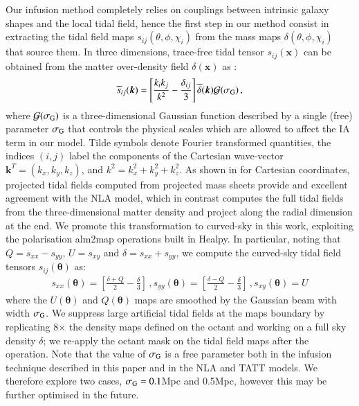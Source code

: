 \documentclass[useAMS,usenatbib]{mn2e}
\begin{document}
Our infusion method completely relies on couplings between intrinsic galaxy shapes and the local tidal field, hence the first step in our method consist in extracting the tidal field maps $s_{ij}(\theta,\phi,\chi_i)$ from the mass maps $\delta(\theta,\phi,\chi_i)$ that source them. In three dimensions, trace-free tidal tensor $s_{ij}(\boldsymbol x)$ can be obtained from the matter over-density field $\delta(\boldsymbol x)$ as   \citep{Catelan_IA_Tidal}:
\begin{eqnarray}
 \widetilde{s}_{ij} (\boldsymbol k)  = \left[\frac{k_i k_j}{k^2} - \frac{\delta_{ij}}{3}\right]  \widetilde {\delta}(\boldsymbol k) \mathcal{G}(\sigma_{\rm G}) \, ,
 \label{eq:sij}
\end{eqnarray}
where $\mathcal{G}(\sigma_{\rm G})$ is a three-dimensional Gaussian function described by a single (free) parameter $\sigma_{\rm G}$ that  controls the physical scales which are allowed to affect the IA term in our model. 
Tilde symbols  denote Fourier transformed quantities,  the indices $(i,j)$ label the components of the Cartesian wave-vector $\boldsymbol{k}^T = (k_x,k_y,k_z)$, and $k^2 = k_x^2 + k_y^2 + k_z^2$. 
As shown in \citet{Tidalator} for Cartesian coordinates, projected tidal fields  computed from projected mass sheets provide and excellent agreement with the NLA model, which in contrast computes the full tidal fields from the three-dimensional matter density and project along the radial dimension at the end. We promote this transformation to curved-sky in this work, exploiting the  polarisation {\sc alm2map} operations built in {\sc Healpy}. In particular, noting that $Q=s_{xx}-s_{yy}$, $U=s_{xy}$ and $\delta=s_{xx}+s_{yy}$, we compute the curved-sky tidal field tensors ${s}_{ij}({\boldsymbol \theta})$ as:
 \begin{eqnarray}
s_{xx}({\boldsymbol \theta})  =  \left[\frac{ \delta + Q}{2}  - \frac{\delta}{3}\right] \, ,s_{yy}({\boldsymbol \theta})  =  \left[\frac{\delta - Q}{2}  - \frac{\delta}{3}\right] \, , s_{xy}({\boldsymbol \theta}) = U
 \label{eq:sij_2D_sph}
 \end{eqnarray}
where the $U({\boldsymbol \theta})$ and $Q({\boldsymbol \theta})$ maps are smoothed by the Gaussian beam with width $\sigma_{\rm G}$. We suppress large artificial tidal fields at the maps boundary by replicating 8$\times$ the density maps defined on the octant and working on a full sky density $\delta$; we re-apply the octant mask on the tidal field maps after the operation. Note that the value of $\sigma_{\rm G}$ is a free parameter both in the infusion technique described in this paper and in the NLA and TATT models. We therefore explore two cases, $\sigma_{\rm G}=0.1$Mpc and 0.5Mpc, however this may be further optimised in the future.
\end{document}
